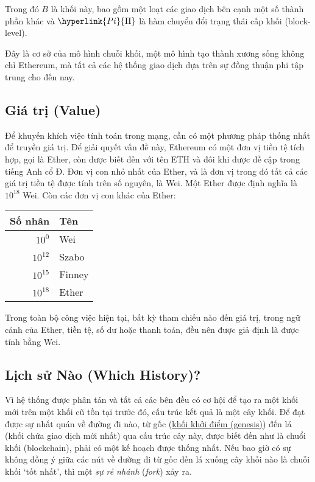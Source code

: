 \documentclass[9pt,oneside]{amsart}
\begin{document}
\begin{multicols}{2}
Trong đó \hyperlink{block}{$B$} là khối này, bao gồm một loạt các giao dịch bên cạnh một số thành phần khác và $\hyperlink{Pi}{\Pi}$ là hàm chuyển đổi trạng thái cấp khối (block-level).

Đây là cơ sở của mô hình chuỗi khối, một mô hình tạo thành xương sống không chỉ Ethereum, mà tất cả các hệ thống giao dịch dựa trên sự đồng thuận phi tập trung cho đến nay.

\subsection{Giá trị (Value)}

Để khuyến khích việc tính toán trong mạng, cần có một phương pháp thống nhất để truyền giá trị. Để giải quyết vấn đề này, Ethereum có một đơn vị tiền tệ tích hợp, gọi là Ether, còn được biết đến với tên {\small ETH} và đôi khi được đề cập trong tiếng Anh cổ Đ. Đơn vị con nhỏ nhất của Ether, và là đơn vị trong đó tất cả các giá trị tiền tệ được tính trên số nguyên, là Wei. Một Ether được định nghĩa là $10^{18}$ Wei. Còn các đơn vị con khác của Ether:
\par
\begin{center}
\begin{tabular}{rl}
\toprule
Số nhân & Tên \\
\midrule
$10^0$ & Wei \\
$10^{12}$ & Szabo \\
$10^{15}$ & Finney \\
$10^{18}$ & Ether \\
\bottomrule
\end{tabular}
\end{center}
\par

Trong toàn bộ công việc hiện tại, bất kỳ tham chiếu nào đến giá trị, trong ngữ cảnh của Ether, tiền tệ, số dư hoặc thanh toán, đều nên được giả định là được tính bằng Wei.

\subsection{Lịch sử Nào (Which History)?}

Vì hệ thống được phân tán và tất cả các bên đều có cơ hội để tạo ra một khối mới trên một khối cũ tồn tại trước đó, cấu trúc kết quả là một cây khối. Để đạt được sự nhất quán về đường đi nào, từ gốc (\hyperlink{Genesis_Block}{khối khởi điểm (genesis)}) đến lá (khối chứa giao dịch mới nhất) qua cấu trúc cây này, được biết đến như là chuổi khối (blockchain), phải có một kế hoạch được thống nhất. Nếu bao giờ có sự không đồng ý giữa các nút về đường đi từ gốc đến lá xuống cây khối nào là chuỗi khối `tốt nhất', thì một \textit{sự rẻ nhánh} (\textit{fork}) xảy ra.


\end{multicols}
\end{document}
